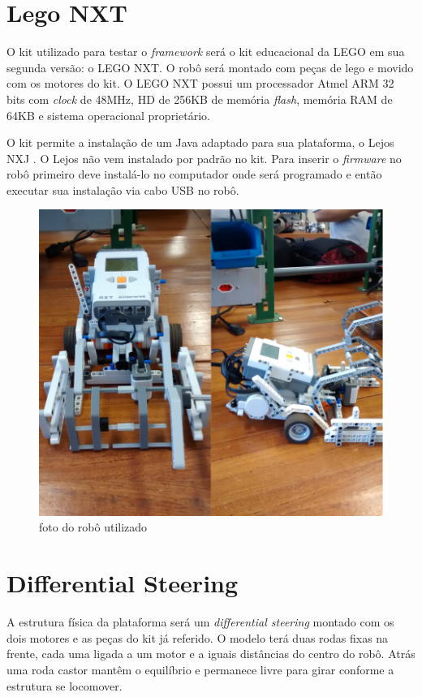 \section{Lego NXT}

O kit utilizado para testar o \textit{framework} será o kit educacional da LEGO em sua segunda versão: o LEGO NXT. O robô será montado com peças de lego e movido com os motores do kit. O LEGO NXT possui um processador Atmel ARM 32 bits com \textit{clock} de 48MHz, HD de 256KB de memória \textit{flash}, memória RAM de 64KB e sistema operacional proprietário.

O kit permite a instalação de um Java adaptado para sua plataforma, o Lejos NXJ \cite{LEJOS_SITE}. O Lejos não vem instalado por padrão no kit. Para inserir o \textit{firmware} no robô primeiro deve instalá-lo no computador onde será programado e então executar sua instalação via cabo USB no robô.

\begin{figure}[h]
	\centering
	\label{fig17}
		\includegraphics[keepaspectratio=true,scale=0.2]{figuras/5nxtBrick.png}
	\caption{foto do robô utilizado}
\end{figure}

\section{Differential Steering}

A estrutura física da plataforma será um \textit{differential steering} montado com os dois motores e as peças do kit já referido. O modelo terá duas rodas fixas na frente, cada uma ligada a um motor e a iguais distâncias do centro do robô. Atrás uma roda castor mantêm o equilíbrio e permanece livre para girar conforme a estrutura se locomover.

